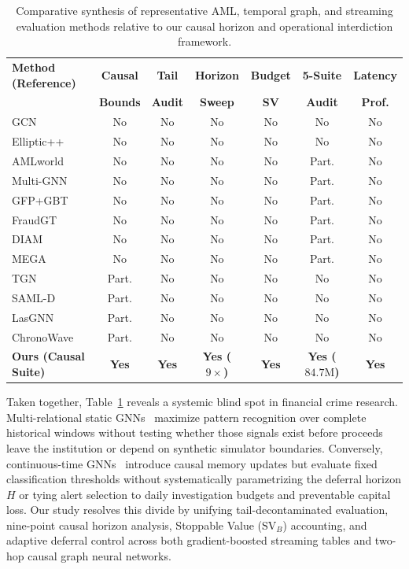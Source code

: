 \documentclass[pdflatex,sn-mathphys,Numbered]{sn-jnl}
\theoremstyle{thmstyleone}
\begin{document}
\begin{table}[t]
\centering
\caption{Comparative synthesis of representative AML, temporal graph, and streaming evaluation methods relative to our causal horizon and operational interdiction framework.}
\label{tab:lit_comparison}
\scriptsize
\setlength{\tabcolsep}{3pt}
\begin{tabular}{@{}lcccccc@{}}
\toprule
\textbf{Method (Reference)} & \textbf{Causal} & \textbf{Tail} & \textbf{Horizon} & \textbf{Budget} & \textbf{5-Suite} & \textbf{Latency} \\
 & \textbf{Bounds} & \textbf{Audit} & \textbf{Sweep} & \textbf{SV} & \textbf{Audit} & \textbf{Prof.} \\
\midrule
GCN~\cite{weber2019elliptic} & No & No & No & No & No & No \\
Elliptic++~\cite{elmougy2023ellipticpp} & No & No & No & No & No & No \\
AMLworld~\cite{altman2023ibmaml} & No & No & No & No & Part. & No \\
Multi-GNN~\cite{egressy2024multigraph} & No & No & No & No & Part. & No \\
GFP+GBT~\cite{blanusa2024gfp} & No & No & No & No & Part. & No \\
FraudGT~\cite{lin2024fraudgt} & No & No & No & No & Part. & No \\
DIAM~\cite{ding2024diam} & No & No & No & No & Part. & No \\
MEGA~\cite{bilgi2026mega} & No & No & No & No & Part. & No \\
TGN~\cite{rossi2020tgn} & Part. & No & No & No & No & No \\
SAML-D~\cite{oztas2023samld} & Part. & No & No & No & No & No \\
LasGNN~\cite{verlaan2025lasgnn} & Part. & No & No & No & No & No \\
ChronoWave~\cite{lin2026chronowave} & Part. & No & No & No & No & No \\
\midrule
\textbf{Ours (Causal Suite)} & \textbf{Yes} & \textbf{Yes} & \textbf{Yes ($9\times$)} & \textbf{Yes} & \textbf{Yes ($84.7\text{M}$)} & \textbf{Yes} \\
\bottomrule
\end{tabular}
\end{table}

Taken together, Table~\ref{tab:lit_comparison} reveals a systemic blind spot in financial crime research. Multi-relational static GNNs~\cite{egressy2024multigraph,lin2024fraudgt,ding2024diam,bilgi2026mega} maximize pattern recognition over complete historical windows without testing whether those signals exist before proceeds leave the institution or depend on synthetic simulator boundaries. Conversely, continuous-time GNNs~\cite{rossi2020tgn,lin2026chronowave,verlaan2025lasgnn} introduce causal memory updates but evaluate fixed classification thresholds without systematically parametrizing the deferral horizon $H$ or tying alert selection to daily investigation budgets and preventable capital loss. Our study resolves this divide by unifying tail-decontaminated evaluation, nine-point causal horizon analysis, Stoppable Value ($\text{SV}_B$) accounting, and adaptive deferral control across both gradient-boosted streaming tables and two-hop causal graph neural networks.
\end{document}
